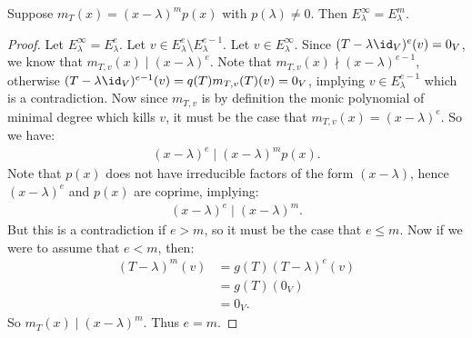    \begin{lemma}\label{lemma:awful}
        Suppose $m_T(x) = (x- \lambda)^m p(x)$ with $p(\lambda) \neq 0$. Then $E_\lambda^\infty = E_\lambda^m$. 
    \end{lemma}
        \begin{proof}
            Let $E_\lambda^{\infty} = E_\lambda^e$. Let $v \in E_\lambda^{e}\setminus E_\lambda^{e-1}$.
            Let $v \in E_\lambda^\infty$. Since $(T-\lambda \id_V)^e(v) = 0_V$, we know that $m_{T,v}(x) \mid (x-\lambda)^e$. Note that $m_{T,v}(x) \nmid (x-\lambda)^{e-1}$, otherwise $(T-\lambda \id_V)^{e-1}(v) = q(T)m_{T,v}(T)(v) = 0_V$, implying $v \in E_\lambda^{e-1}$ which is a contradiction. Now since $m_{T,v}$ is by definition the monic polynomial of minimal degree which kills $v$, it must be the case that $m_{T,v}(x) = (x-\lambda)^e$. So we have:
                \begin{equation*}
                \begin{split}
                    (x-\lambda)^e \mid (x-\lambda)^m p(x).
                \end{split}
                \end{equation*}
            Note that $p(x)$ does not have irreducible factors of the form $(x- \lambda)$, hence $(x-\lambda)^e$ and $p(x)$ are coprime, implying:
                \begin{equation*}
                \begin{split}
                    (x-\lambda)^e \mid (x-\lambda)^m.
                \end{split}
                \end{equation*}
            But this is a contradiction if $e > m$, so it must be the case that $e \leq m$. Now if we were to assume that $e < m$, then:
                \begin{equation*}
                \begin{split}
                    (T - \lambda)^m(v)
                    & = g(T)(T - \lambda)^e(v) \\
                    & = g(T)(0_V) \\
                    & = 0_V.
                \end{split}
                \end{equation*}
            So $m_T(x) \mid (x- \lambda)^m$. Thus $e = m$.
        \end{proof}

